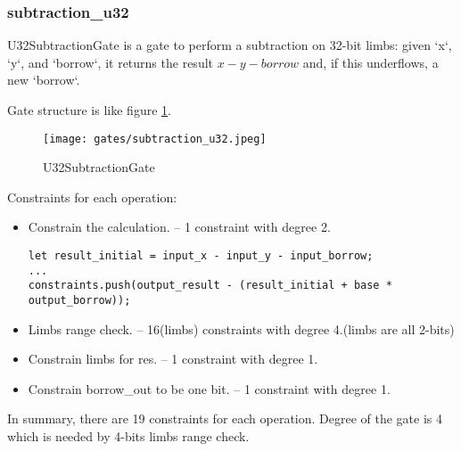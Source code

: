 \subsubsection{subtraction\_u32}

U32SubtractionGate is a gate to perform a subtraction on 32-bit limbs: given `x`, `y`, and `borrow`, it returns 
the result $x - y - borrow$ and, if this underflows, a new `borrow`.

Gate structure is like figure \ref{fig:subtraction-u32}.

\begin{figure}[!ht]
    \centering
    \texttt{[image: gates/subtraction\_u32.jpeg]}
    \caption{U32SubtractionGate}
    \label{fig:subtraction-u32}
\end{figure}

Constraints for each operation:
\begin{itemize}
    \item Constrain the calculation. -- 1 constraint with degree 2.
    \begin{lstlisting}
let result_initial = input_x - input_y - input_borrow;
...
constraints.push(output_result - (result_initial + base * output_borrow));
    \end{lstlisting}
    \item Limbs range check. -- 16(limbs) constraints with degree 4.(limbs are all 2-bits)
    \item Constrain limbs for res. -- 1 constraint with degree 1.
    \item Constrain borrow\_out to be one bit. -- 1 constraint with degree 1.
\end{itemize}

In summary, there are 19 constraints for each operation. Degree of the gate is 4 which is needed by 4-bits limbs range check.